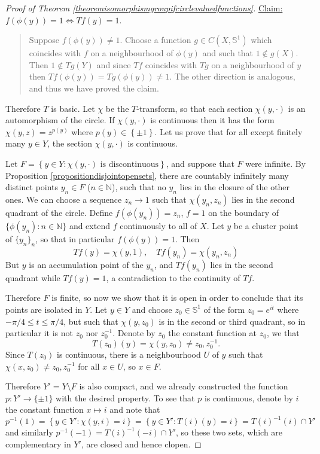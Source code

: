 \documentclass[letter,11pt]{amsart}
\theoremstyle{plain}		\newtheorem{theorem}[generalnumbering]{Theorem}
\theoremstyle{plain}		\newtheorem{corollary}[generalnumbering]{Corollary}
\theoremstyle{definition}		\newtheorem{definition}[generalnumbering]{Definition}
\theoremstyle{definition}		\newtheorem{example}[generalnumbering]{Example}
\theoremstyle{plain}		\newtheorem{proposition}[generalnumbering]{Proposition}
\theoremstyle{plain}		\newtheorem{lemma}[generalnumbering]{Lemma}
\theoremstyle{plain}    \newtheorem{plainstyle}[generalnumbering]{\namefordifferentenvironment}
\theoremstyle{plain}    \newtheorem*{plainstyle*}{\namefordifferentenvironment}
\theoremstyle{definition}    \newtheorem{definitionstyle}[generalnumbering]{\namefordifferentenvironment}
\theoremstyle{definition}    \newtheorem*{definitionstyle*}{\namefordifferentenvironment}
\begin{document}
\begin{proof}[Proof of Theorem \ref{theoremisomorphismgroupifcirclevaluedfunctions}]
	\uline{Claim:} $f(\phi(y))=1\iff Tf(y)=1$.
	
	\begin{quote}
	Suppose $f(\phi(y))\neq 1$. Choose a function $g\in C(X,\mathbb{S}^1)$ which coincides with $f$ on a neighbourhood of $\phi(y)$ and such that $1\not\in g(X)$. Then $1\not\in Tg(Y)$ and since $Tf$ coincides with $Tg$ on a neighbourhood of $y$ then $Tf(\phi(y))=Tg(\phi(y))\neq 1$. The other direction is analogous, and thus we have proved the claim.
	\end{quote}
	
	Therefore $T$ is basic. Let $\chi$ be the $T$-transform, so that each section $\chi(y,\cdot)$ is an automorphism of the circle. If $\chi(y,\cdot)$ is continuous then it has the form $\chi(y,z)=z^{p(y)}$ where $p(y)\in\left\{\pm1\right\}$. Let us prove that for all except finitely many $y\in Y$, the section $\chi(y,\cdot)$ is continuous.
	
	Let $F=\left\{y\in Y:\chi(y,\cdot)\text{ is discontinuous}\right\}$, and suppose that $F$ were infinite. By Proposition \ref{propositiondisjointopensets}, there are countably infinitely many distinct points $y_n\in F$ ($n\in\mathbb{N}$), such that no $y_n$ lies in the closure of the other ones. We can choose a sequence $z_n\to 1$ such that $\chi(y_n,z_n)$ lies in the second quadrant of the circle. Define $f(\phi(y_n))=z_n$, $f=1$ on the boundary of $\{\phi(y_n):n\in\mathbb{N}\}$ and extend $f$ continuously to all of $X$. Let $y$ be a cluster point of $\{y_n\}_n$, so that in particular $f(\phi(y))=1$. Then
	\[Tf(y)=\chi(y,1),\quad Tf(y_n)=\chi(y_n,z_n)\]
	But $y$ is an accumulation point of the $y_n$, and $Tf(y_n)$ lies in the second quadrant while $Tf(y)=1$, a contradiction to the continuity of $Tf$.
	
	Therefore $F$ is finite, so now we show that it is open in order to conclude that its points are isolated in $Y$. Let $y\in Y$ and choose $z_0\in\mathbb{S}^1$ of the form $z_0=e^{it}$ where $-\pi/4\leq t\leq \pi/4$, but such that $\chi(y,z_0)$ is in the second or third quadrant, so in particular it is not $z_0$ nor $z_0^{-1}$. Denote by $z_0$ the constant function at $z_0$, we that
	\[T(z_0)(y)=\chi(y,z_0)\neq z_0,z_0^{-1}.\]
	Since $T(z_0)$ is continuous, there is a neighbourhood $U$ of $y$ such that $\chi(x,z_0)\neq z_0,z_0^{-1}$ for all $x\in U$, so $x\in F$.
	
	Therefore $Y'=Y\setminus F$ is also compact, and we already constructed the function $p\colon Y'\to\{\pm 1\}$ with the desired property. To see that $p$ is continuous, denote by $i$ the constant function $x\mapsto i$ and note that
	\[p^{-1}(1)=\left\{y\in Y':\chi(y,i)=i\right\}=\left\{y\in Y':T(i)(y)=i\right\}=T(i)^{-1}(i)\cap Y'\]
	and similarly $p^{-1}(-1)=T(i)^{-1}(-i)\cap Y'$, so these two sets, which are complementary in $Y'$, are closed and hence clopen.
\end{proof}
\end{document}
